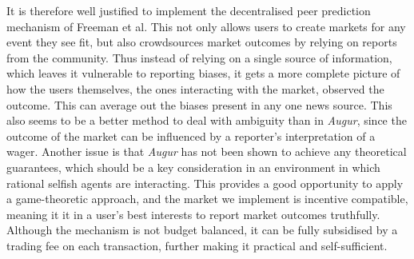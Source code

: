 It is therefore well justified to implement the decentralised peer prediction
mechanism of Freeman et al. This not only allows users to create markets for
any event they see fit, but also crowdsources market outcomes by relying on
reports from the community. Thus instead of relying on a single source of
information, which leaves it vulnerable to reporting biases, it gets a more
complete picture of how the users themselves, the ones interacting with the
market, observed the outcome. This can average out the biases present in any
one news source. This also seems to be a better method to deal with ambiguity
than in \emph{Augur}, since the outcome of the market can be influenced by a
reporter's interpretation of a wager. Another issue is that \emph{Augur} has
not been shown to achieve any theoretical guarantees, which should be a key
consideration in an environment in which rational selfish agents are
interacting. This provides a good opportunity to apply a game-theoretic
approach, and the market we implement is incentive compatible, meaning it it in
a user's best interests to report market outcomes truthfully. Although the
mechanism is not budget balanced, it can be fully subsidised by a trading fee
on each transaction, further making it practical and self-sufficient.

